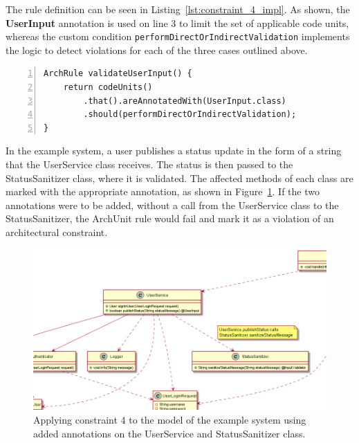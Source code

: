 The rule definition can be seen in Listing~\ref{lst:constraint_4_impl}. As shown, the \textbf{UserInput} annotation is used on line 3 to limit the set of applicable code units, whereas the custom condition \texttt{performDirectOrIndirectValidation} implements the logic to detect violations for each of the three cases outlined above.
    
\begin{minipage}{\linewidth}
\begin{lstlisting}[caption={Rule definition for constraint 4.}, captionpos=b, label=lst:constraint_4_impl, numbers=left]
ArchRule validateUserInput() {
    return codeUnits()
        .that().areAnnotatedWith(UserInput.class)
        .should(performDirectOrIndirectValidation);
}
\end{lstlisting}
\end{minipage}

In the example system, a user publishes a status update in the form of a string that the UserService class receives. The status is then passed to the StatusSanitizer class, where it is validated. The affected methods of each class are marked with the appropriate annotation, as shown in Figure~\ref{fig:validate_input_toy_system}. If the two annotations were to be added, without a call from the UserService class to the StatusSanitizer, the ArchUnit rule would fail and mark it as a violation of an architectural constraint.

\begin{figure}
    \centering
    \includegraphics[width=\textwidth]{figure/toyexamples/validate_input_toy_system.png}
    \caption{Applying constraint 4 to the model of the example system using added annotations on the UserService and StatusSanitizer class.}
    \label{fig:validate_input_toy_system}
\end{figure}

